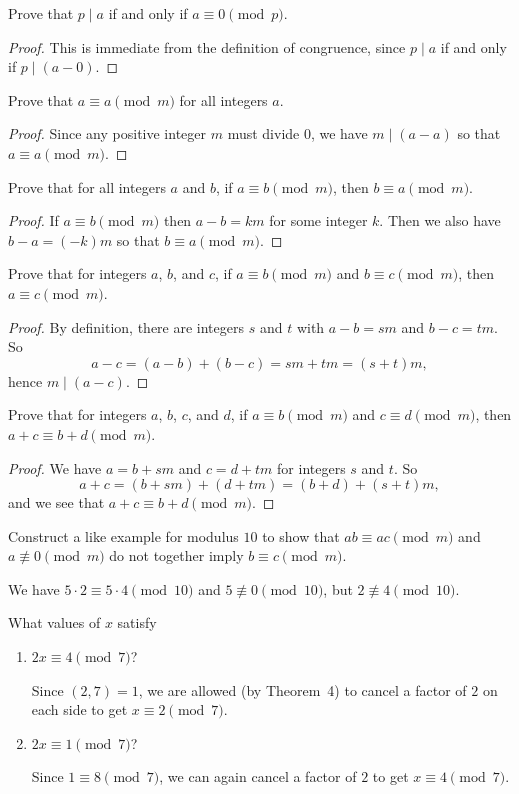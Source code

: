  Prove that $p\mid a$ if and only if $a\equiv0\pmod{p}$.
\begin{proof}
  This is immediate from the definition of congruence, since $p\mid a$
  if and only if $p\mid(a-0)$.
\end{proof}

 Prove that $a\equiv a\pmod{m}$ for all integers $a$.
\begin{proof}
  Since any positive integer $m$ must divide $0$, we have
  $m\mid(a - a)$ so that $a\equiv a\pmod{m}$.
\end{proof}

 Prove that for all integers $a$ and $b$, if
$a\equiv b\pmod{m}$, then $b\equiv a\pmod{m}$.
\begin{proof}
  If $a\equiv b\pmod{m}$ then $a - b = km$ for some integer $k$. Then
  we also have $b - a = (-k)m$ so that $b\equiv a\pmod{m}$.
\end{proof}

 Prove that for integers $a$, $b$, and $c$, if
$a\equiv b\pmod m$ and $b\equiv c\pmod m$, then $a\equiv c\pmod m$.
\begin{proof}
  By definition, there are integers $s$ and $t$ with $a - b = sm$ and
  $b - c = tm$. So
  \begin{equation*}
    a - c = (a - b) + (b - c) = sm + tm = (s + t)m,
  \end{equation*}
  hence $m\mid(a - c)$.
\end{proof}

 Prove that for integers $a$, $b$, $c$, and $d$, if
$a\equiv b\pmod m$ and $c\equiv d\pmod m$, then
$a + c\equiv b + d\pmod m$.
\begin{proof}
  We have $a = b + sm$ and $c = d + tm$ for integers $s$ and $t$. So
  \begin{equation*}
    a + c = (b + sm) + (d + tm) = (b + d) + (s + t)m,
  \end{equation*}
  and we see that $a + c\equiv b + d\pmod m$.
\end{proof}

 Construct a like example for modulus $10$ to show that
$ab\equiv ac\pmod m$ and $a\not\equiv0\pmod m$ do not together imply
$b\equiv c\pmod m$.
\begin{solution}
  We have $5\cdot2\equiv5\cdot4\pmod{10}$ and $5\not\equiv0\pmod{10}$,
  but $2\not\equiv4\pmod{10}$.
\end{solution}

 What values of $x$ satisfy
\begin{enumerate}
\item $2x\equiv4\pmod7$?
  \begin{solution}
    Since $(2,7) = 1$, we are allowed (by Theorem~4) to cancel a
    factor of $2$ on each side to get $x\equiv2\pmod7$.
  \end{solution}
\item $2x\equiv1\pmod7$?
  \begin{solution}
    Since $1\equiv8\pmod7$, we can again cancel a factor of $2$ to get
    $x\equiv4\pmod7$.
  \end{solution}
\end{enumerate}

